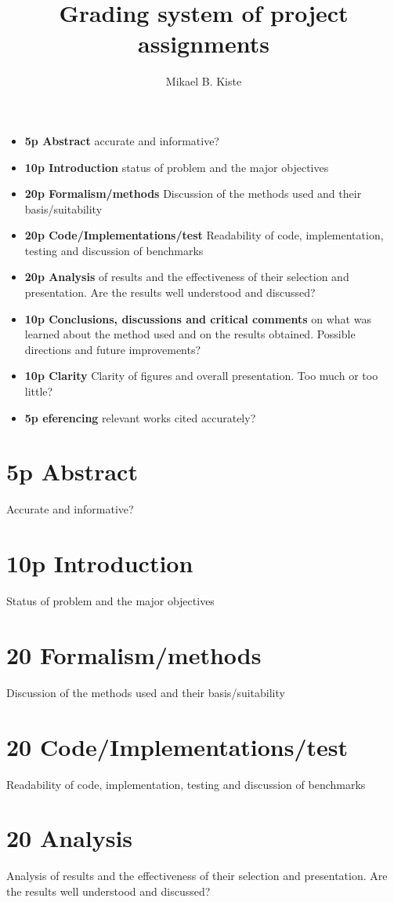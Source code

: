 \documentclass{article}
\title{Grading system of project assignments}
\author{Mikael B. Kiste}
\begin{document}
	\maketitle
		\begin{itemize}
	\item{\textbf{5p Abstract} accurate and informative?}
	\item{\textbf{10p Introduction} status of problem and the major objectives}
	\item{\textbf{20p Formalism/methods} Discussion of the methods used and their basis/suitability}
	\item{\textbf{20p Code/Implementations/test} Readability of code, implementation, testing and discussion of benchmarks}
	\item{\textbf{20p Analysis} of results and the effectiveness of their selection and presentation. Are the results well understood and discussed?}
	\item{\textbf{10p Conclusions, discussions and critical comments} on what was learned about the method used and on the results obtained. Possible directions and future improvements?}
	\item{\textbf{10p Clarity} Clarity of figures and overall presentation. Too much or too little?}
	\item{\textbf{5p eferencing} relevant works cited accurately?}
	\end{itemize}

	\newpage
	\section*{5p Abstract}
	Accurate and informative?
	\section*{10p Introduction}
	Status of problem and the major objectives
	\section*{20 Formalism/methods}
	Discussion of the methods used and their basis/suitability
	\section*{20 Code/Implementations/test}
	Readability of code, implementation, testing and discussion of benchmarks
	\section*{20 Analysis}
	Analysis of results and the effectiveness of their selection and presentation. Are the results well understood and discussed?
\end{document}
